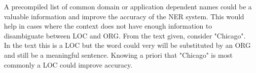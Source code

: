 \documentclass[12pt]{article}
\newenvironment{answer}[2][Answer]{\begin{trivlist}
\item[\hskip \labelsep {\bfseries #1}\hskip \labelsep {\bfseries #2:}]}{\end{trivlist}}
\begin{document}
\begin{answer}{d)}

A precompiled list of common domain or application dependent names could be a valuable information and improve the accuracy of the NER system. This would help in cases where the context does not have enough information to disambiguate between LOC and ORG. From the text given, consider "Chicago". In the text this is a LOC but the word could very will be substituted by an ORG and still be a meaningful sentence. Knowing a priori that "Chicago" is most commonly a LOC could improve accuracy.
\end{answer}
\end{document}
